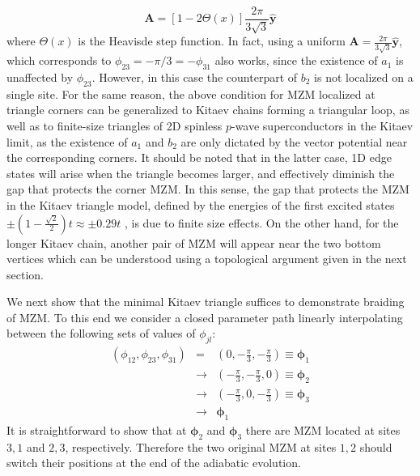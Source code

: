 \documentclass[aps,prb,twocolumn,showpacs,amsmath,amssymb,superscriptaddress]{revtex4-2}
\let\oldhat\hat
\renewcommand{\hat}[1]{\oldhat{\mathbf{#1}}}
\renewcommand{\vec}[1]{\mathbf{#1}}
\begin{document}
\begin{equation}\label{eq:Astep}
  \vec{A} =\left[1-2\Theta(x)\right]\frac{2 \pi}{3\sqrt{3}} \hat{y}
\end{equation}
where $\Theta(x)$ is the Heavisde step function. In fact, using a uniform $\vec{A} = \frac{2 \pi}{3\sqrt{3}} \hat{y}$, which corresponds to $\phi_{23} = -\pi/3 = -\phi_{31}$ also works, since the existence of $a_1$ is unaffected by $\phi_{23}$. However, in this case the counterpart of $b_2$ is not localized on a single site. For the same reason, the above condition for MZM localized at triangle corners can be generalized to Kitaev chains forming a triangular loop, as well as to finite-size triangles of 2D spinless $p$-wave superconductors in the Kitaev limit, as the existence of $a_1$ and $b_2$ are only dictated by the vector potential near the corresponding corners. It should be noted that in the latter case, 1D edge states will arise when the triangle becomes larger, and effectively diminish the gap that protects the corner MZM. In this sense, the gap that protects the MZM in the Kitaev triangle model, defined by the energies of the first excited states $\pm (1-\frac{\sqrt{2}}{2})t\approx \pm 0.29 t$ \cite{supp}, is due to finite size effects. On the other hand, for the longer Kitaev chain, another pair of MZM will appear near the two bottom vertices which can be understood using a topological argument given in the next section.

We next show that the minimal Kitaev triangle suffices to demonstrate braiding of MZM. To this end we consider a closed parameter path linearly interpolating between the following sets of values of $\phi_{jl}$:
\begin{eqnarray}
    (\phi_{12},\phi_{23},\phi_{31}) &=& \left(0,-\frac{\pi}{3},-\frac{\pi}{3}\right ) \equiv \bm \phi_1 \\\nonumber
    &\rightarrow& \left(-\frac{\pi}{3},-\frac{\pi}{3},0 \right) \equiv \bm \phi_2 \\\nonumber
    &\rightarrow& \left(-\frac{\pi}{3},0,-\frac{\pi}{3} \right) \equiv \bm \phi_3 \\\nonumber
    &\rightarrow& \bm \phi_1
\end{eqnarray}
It is straightforward to show that at $\bm \phi_{2}$ and $\bm \phi_3$ there are MZM located at sites $3,1$ and $2,3$, respectively. Therefore the two original MZM at sites $1,2$ should switch their positions at the end of the adiabatic evolution.
\end{document}
